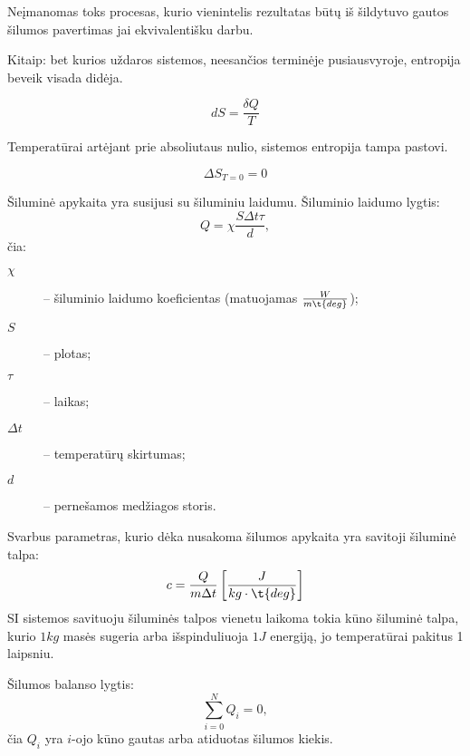 \begin{defn}
  Neįmanomas toks procesas, kurio vienintelis rezultatas būtų iš
  šildytuvo gautos šilumos pavertimas jai ekvivalentišku darbu.

  Kitaip: bet kurios uždaros sistemos, neesančios terminėje pusiausvyroje,
  entropija beveik visada didėja.

  \begin{equation*}
    dS = \frac{\delta Q}{T}
  \end{equation*}
\end{defn}

\begin{defn}
  Temperatūrai artėjant prie absoliutaus nulio, sistemos entropija
  tampa pastovi.

  \begin{equation*}
    \Delta S_{T=0} = 0
  \end{equation*}
\end{defn}

Šiluminė apykaita yra susijusi su šiluminiu laidumu. Šiluminio
laidumo lygtis:
\begin{equation*}
  Q = \chi\frac{S \Delta t \tau}{d},
\end{equation*}
čia:
\begin{description}
  \item[$\chi$] – šiluminio laidumo koeficientas
    (matuojamas $\frac{W}{m \t{deg}}$);
  \item[$S$] – plotas;
  \item[$\tau$] – laikas;
  \item[$\Delta t$] – temperatūrų skirtumas;
  \item[$d$] – pernešamos medžiagos storis.
\end{description}

Svarbus parametras, kurio dėka nusakoma šilumos apykaita yra
savitoji šiluminė talpa:
\begin{equation*}
  c = \frac{Q}{m\Delta t} \left[ \frac{J}{kg\cdot\t{deg}} \right]
\end{equation*}
SI sistemos savituoju šiluminės talpos vienetu laikoma tokia kūno
šiluminė talpa, kurio $1 kg$ masės sugeria arba išspinduliuoja
$1 J$ energiją, jo temperatūrai pakitus 1 laipsniu.

Šilumos balanso lygtis:
\begin{equation*}
  \sum _{i=0} ^{N} Q_{i} = 0,
\end{equation*}
čia $Q_{i}$ yra $i$-ojo kūno gautas arba atiduotas šilumos kiekis.

